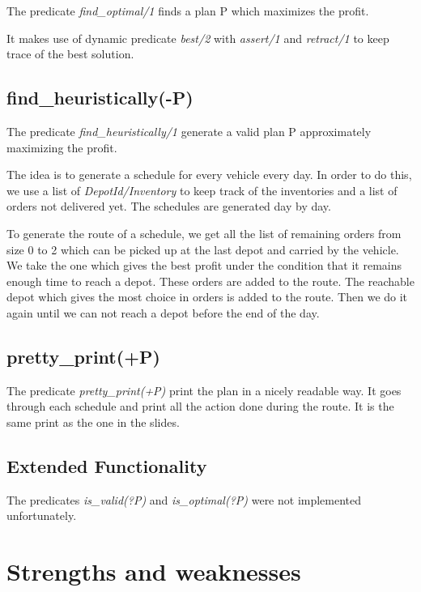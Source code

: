 \documentclass{article}
\begin{document}
The predicate \textit{find\_optimal/1} finds a plan P which maximizes the profit.

It makes use of dynamic predicate \textit{best/2} with \textit{assert/1} and \textit{retract/1} to keep trace of the best solution.

\subsection{find\_heuristically(-P)}

The predicate \textit{find\_heuristically/1} generate a valid plan P approximately maximizing the profit.

The idea is to generate a schedule for every vehicle every day.
In order to do this, we use a list of \textit{DepotId/Inventory} to keep track of the inventories and a list of orders not delivered yet. The schedules are generated day by day.

To generate the route of a schedule, we get all the list of remaining orders from size 0 to 2 which can be picked up at the last depot and carried by the vehicle. We take the one which gives the best profit under the condition that it remains enough time to reach a depot. These orders are added to the route. The reachable depot which gives the most choice in orders is added to the route. Then we do it again until we can not reach a depot before the end of the day.

\subsection{pretty\_print(+P)}

The predicate \textit{pretty\_print(+P)} print the plan in a nicely readable way. It goes through each schedule and print all the action done during the route. It is the same print as the one in the slides.


\subsection{Extended Functionality}

The predicates \textit{is\_valid(?P)} and \textit{is\_optimal(?P)} were not implemented unfortunately.



\section{Strengths and weaknesses}
\end{document}
